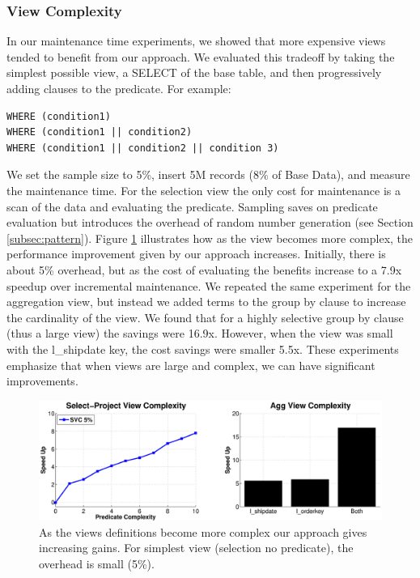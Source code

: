 \subsubsection{View Complexity}
In our maintenance time experiments, we showed that more expensive views tended to benefit from our approach.
We evaluated this tradeoff by taking the simplest possible view, a SELECT of the base table, and then progressively adding clauses to the predicate.
For example:
\begin{lstlisting}
WHERE (condition1)
WHERE (condition1 || condition2)
WHERE (condition1 || condition2 || condition 3)
\end{lstlisting}
We set the sample size to 5\%, insert 5M records (8\% of Base Data), and measure the maintenance time.
For the selection view the only cost for maintenance is a scan of the data and evaluating the predicate. 
Sampling saves on predicate evaluation but introduces the overhead of random number generation (see Section \ref{subsec:pattern}). 
Figure \ref{exp11overheads} illustrates how as the view becomes more complex, the performance improvement given
by our approach increases.
Initially, there is about 5\% overhead, but as the cost of evaluating the benefits increase to a 7.9x speedup over incremental maintenance.
We repeated the same experiment for the aggregation view, but instead we added terms to the group by clause to increase the
cardinality of the view.
We found that for a highly selective group by clause (thus a large view) the savings were 16.9x.
However, when the view was small with the l\_shipdate key, the cost savings were smaller 5.5x.
These experiments emphasize that when views are large and complex, we can have significant improvements.
\begin{figure}[ht!]
\hspace{-3.5em}
\vspace{-0.75em}
 \includegraphics[scale=0.21]{exp/complexity_efficiency_tradeoff.eps}
 \caption{As the views definitions become more complex our approach gives increasing gains. For simplest view (selection no predicate), the overhead is small (5\%).\label{exp11overheads}}
\end{figure}

